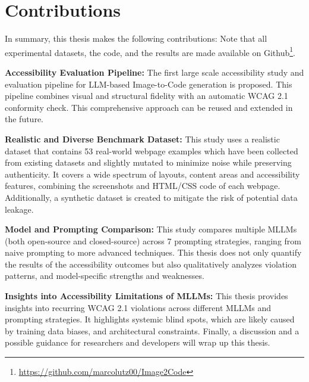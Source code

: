 \newpage
\section{Contributions}
In summary, this thesis makes the following contributions: \newline
Note that all experimental datasets, the code, and the results are made available on 
Github\footnote{\url{https://github.com/marcolutz00/Image2Code}}.\newline

\textbf{Accessibility Evaluation Pipeline:}
The first large scale accessibility study and evaluation pipeline for LLM-based
Image-to-Code generation is proposed. This pipeline combines visual and structural 
fidelity with an automatic WCAG 2.1 conformity check. This comprehensive 
approach can be reused and extended in the future.\newline

\textbf{Realistic and Diverse Benchmark Dataset:}
This study uses a realistic dataset that contains 53 real-world webpage 
examples which have been collected from existing datasets and slightly mutated to
minimize noise while preserving authenticity. It covers a wide spectrum of layouts, content 
areas and accessibility features, combining the screenshots 
and HTML/CSS code of each webpage. Additionally, a synthetic 
dataset is created to mitigate the risk of potential 
data leakage.\newline

\textbf{Model and Prompting Comparison:}
This study compares multiple MLLMs (both open-source and closed-source) across 7 prompting strategies, ranging 
from naive prompting to more advanced techniques. This thesis does not 
only quantify the results of the accessibility outcomes but also 
qualitatively analyzes violation patterns, and model-specific
strengths and weaknesses.
\newline

\textbf{Insights into Accessibility Limitations of MLLMs:}
This thesis provides insights into recurring WCAG 2.1 violations across 
different MLLMs and prompting strategies. It highlights systemic 
blind spots, which are likely caused by training data biases, 
and architectural constraints. Finally, a discussion and a
possible guidance for researchers and developers will 
wrap up this thesis.







